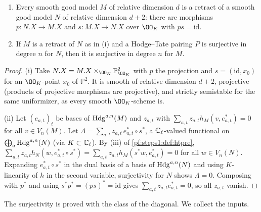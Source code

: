 \begin{lemma}[Retracts]\label{pf:steps1:retract}
\begin{enumerate}[label=\textup{(\roman*)},nosep]
\item Every smooth good model $M$ of relative dimension $d$ is a retract of a smooth good model $N$ of relative dimension
  $d+2$: there are morphisms $p\colon N.X\to M.X$ and $s\colon M.X\to N.X$ over $\OO_K$ with $ps=\mathrm{id}$.
\item If $M$ is a retract of $N$ as in \textup{(i)} and a Hodge--Tate pairing $P$ is surjective in degree $n$ for $N$, then it is
  surjective in degree $n$ for $M$.
\end{enumerate}
\end{lemma}

\begin{proof}
(i) Take $N.X=M.X\times_{\OO_K}\mathbb P^2_{\OO_K}$ with $p$ the projection and $s=(\mathrm{id},x_0)$ for an $\OO_K$-point $x_0$ of
$\mathbb P^2$. It is smooth of relative dimension $d+2$, projective (products of projective morphisms are projective), and
strictly semistable for the same uniformizer, as every smooth $\OO_K$-scheme is.

(ii) Let $(e_{a,t})_t$ be bases of $\mathrm{Hdg}^{a,n}(M)$ and $z_{a,t}$ with $\sum_{a,t}z_{a,t}h_M(v,e^*_{a,t})=0$ for all $v\in V_n(M)$.
Let $\Lambda=\sum_{a,t}z_{a,t}\,e^*_{a,t}\circ s^*$, a $\mathbb{C}_\ell$-valued functional on $\bigoplus_a\mathrm{Hdg}^{a,n}(N)$ (via
$K\subset\mathbb{C}_\ell$). By (iii) of \cref{pf:steps1:def:htpre}, $\sum_{a,t}z_{a,t}h_N(w,e^*_{a,t}\circ s^*)=
\sum_{a,t}z_{a,t}h_M(s^*w,e^*_{a,t})=0$ for all $w\in V_n(N)$. Expanding $e^*_{a,t}\circ s^*$ in the dual basis of a basis
of $\mathrm{Hdg}^{a,n}(N)$ and using $K$-linearity of $h$ in the second variable, surjectivity for $N$ shows $\Lambda=0$.
Composing with $p^*$ and using $s^*p^*=(ps)^*=\mathrm{id}$ gives $\sum_{a,t}z_{a,t}e^*_{a,t}=0$, so all $z_{a,t}$ vanish.
\end{proof}

The surjectivity is proved with the class of the diagonal. We collect the inputs.

